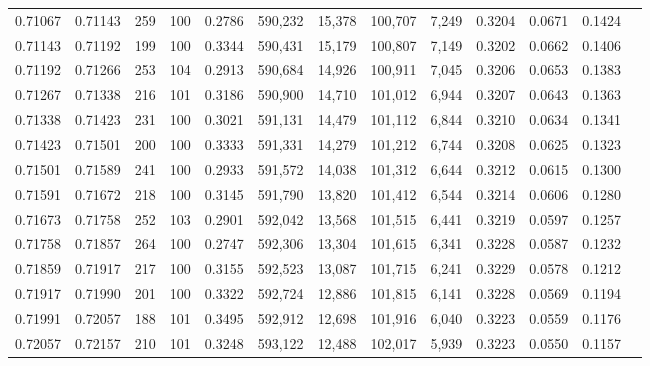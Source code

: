 \begin{tabular}{rrrrrrrrrrrrr}
0.71067 & 0.71143 &   259 & 100 &                                     0.2786 & 590,232 &  15,378 & 100,707 &   7,249 & 0.3204 & 0.0671 & 0.1424 \\
0.71143 & 0.71192 &   199 & 100 &                                     0.3344 & 590,431 &  15,179 & 100,807 &   7,149 & 0.3202 & 0.0662 & 0.1406 \\
0.71192 & 0.71266 &   253 & 104 &                                     0.2913 & 590,684 &  14,926 & 100,911 &   7,045 & 0.3206 & 0.0653 & 0.1383 \\
0.71267 & 0.71338 &   216 & 101 &                                     0.3186 & 590,900 &  14,710 & 101,012 &   6,944 & 0.3207 & 0.0643 & 0.1363 \\
0.71338 & 0.71423 &   231 & 100 &                                     0.3021 & 591,131 &  14,479 & 101,112 &   6,844 & 0.3210 & 0.0634 & 0.1341 \\
0.71423 & 0.71501 &   200 & 100 &                                     0.3333 & 591,331 &  14,279 & 101,212 &   6,744 & 0.3208 & 0.0625 & 0.1323 \\
0.71501 & 0.71589 &   241 & 100 &                                     0.2933 & 591,572 &  14,038 & 101,312 &   6,644 & 0.3212 & 0.0615 & 0.1300 \\
0.71591 & 0.71672 &   218 & 100 &                                     0.3145 & 591,790 &  13,820 & 101,412 &   6,544 & 0.3214 & 0.0606 & 0.1280 \\
0.71673 & 0.71758 &   252 & 103 &                                     0.2901 & 592,042 &  13,568 & 101,515 &   6,441 & 0.3219 & 0.0597 & 0.1257 \\
0.71758 & 0.71857 &   264 & 100 &                                     0.2747 & 592,306 &  13,304 & 101,615 &   6,341 & 0.3228 & 0.0587 & 0.1232 \\
0.71859 & 0.71917 &   217 & 100 &                                     0.3155 & 592,523 &  13,087 & 101,715 &   6,241 & 0.3229 & 0.0578 & 0.1212 \\
0.71917 & 0.71990 &   201 & 100 &                                     0.3322 & 592,724 &  12,886 & 101,815 &   6,141 & 0.3228 & 0.0569 & 0.1194 \\
0.71991 & 0.72057 &   188 & 101 &                                     0.3495 & 592,912 &  12,698 & 101,916 &   6,040 & 0.3223 & 0.0559 & 0.1176 \\
0.72057 & 0.72157 &   210 & 101 &                                     0.3248 & 593,122 &  12,488 & 102,017 &   5,939 & 0.3223 & 0.0550 & 0.1157 \\

\end{tabular}
